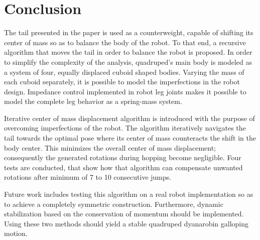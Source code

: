 \section{Conclusion}\label{sec:conclusion}
 
The tail presented in the paper is used as a counterweight, capable of shifting its center of mass so as to balance the body of the robot. To that end, a recursive algorithm that moves the tail in order to balance the robot is proposed. In order to simplify the complexity of the analysis, quadruped's main body is modeled as a system of four, equally displaced cuboid shaped bodies. Varying the mass of each cuboid separately, it is possible to model the imperfections in the robot design. Impedance control implemented in robot leg joints makes it possible to model the complete leg behavior as a spring-mass system.   

Iterative center of mass displacement algorithm is introduced with the purpose of overcoming imperfections of the robot. The algorithm iteratively navigates the tail towards the optimal pose where its center of mass counteracts the shift in the body center. This minimizes the overall center of mass displacement; consequently the generated rotations during hopping become negligible. Four tests are conducted, that show how that algorithm can compensate unwanted rotations after minimum of 7 to 10 consecutive jumps.

Future work includes testing this algorithm on a real robot implementation so as to achieve a completely symmetric construction. Furthermore, dynamic stabilization based on the conservation of momentum should be implemented. Using these two methods should yield a stable quadruped dyanarobin galloping motion.
